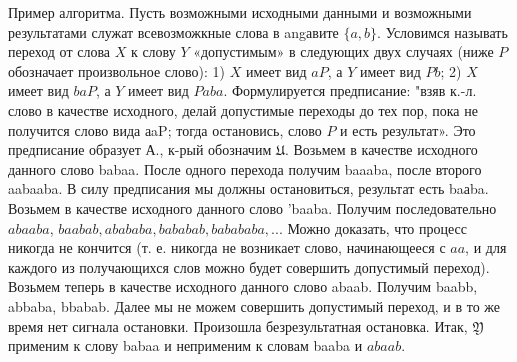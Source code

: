 \documentclass[10pt]{article}
\begin{document}
Пример алгоритма. Пусть возможными исходными данными и возможными результатами служат всевозможкные слова в angавите $\{a, b\}$. Условимся называть переход от слова $X$ к слову $Y$ «допустимым» в следующих двух случаях (ниже $P$ обозначает произвольное слово): 1) $X$ имеет вид $a P$, а $Y$ имеет вид $P b$; 2) $X$ имеет вид $b a P$, а $Y$ имеет вид $P a b a$. Формулируется предписание: "взяв к.-л. слово в качестве исходного, делай допустимые переходы до тех пор, пока не получится слово вида аaP; тогда остановись, слово $P$ и есть результат». Это предписание образует А., к-рый обозначим $\mathfrak{U}$. Возьмем в качестве исходного данного слово babaa. После одного перехода получим baaaba, после второго aabaaba. В силу предписания мы должны остановиться, результат есть baаba. Возьмем в качестве исходного данного слово 'baaba. Получим последовательно $a b a a b a$, $b a a b a b, a b a b a b a, b a b a b a b, b a b a b a b a, . .$. Можно доказать, что процесс никогда не кончится (т. е. никогда не возникает слово, начинающееся с $a a$, и для каждого из получающихся слов можно будет совершить допустимый переход). Возьмем теперь в качестве исходного данного слово abaab. Получим baabb, abbaba, bbabab. Далее мы не можем совершить допустимый переход, и в то же время нет сигнала остановки. Произошла безрезультатная остановка. Итак, $\mathfrak{Y}$ применим к слову babaa и неприменим к словам baaba и $a b a a b$.
\end{document}
